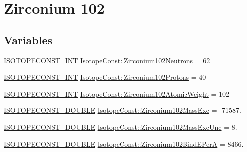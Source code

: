 \hypertarget{group___isotope_const-_zirconium-_zr102}{}\section{Zirconium 102}
\label{group___isotope_const-_zirconium-_zr102}
\subsection*{Variables}
\begin{DoxyCompactItemize}
\item 
\mbox{\hyperlink{group___isotope_const-_macros_ga5f18360b3e99483a35c32d789e62621c}{I\+S\+O\+T\+O\+P\+E\+C\+O\+N\+S\+T\+\_\+\+I\+NT}} \mbox{\hyperlink{group___isotope_const-_zirconium-_zr102_ga544e80a8b6996766583acc30407a1fa5}{Isotope\+Const\+::\+Zirconium102\+Neutrons}} = 62
\item 
\mbox{\hyperlink{group___isotope_const-_macros_ga5f18360b3e99483a35c32d789e62621c}{I\+S\+O\+T\+O\+P\+E\+C\+O\+N\+S\+T\+\_\+\+I\+NT}} \mbox{\hyperlink{group___isotope_const-_zirconium-_zr102_ga035b7fab1e47c9f0e38c1d3305ca6eb5}{Isotope\+Const\+::\+Zirconium102\+Protons}} = 40
\item 
\mbox{\hyperlink{group___isotope_const-_macros_ga5f18360b3e99483a35c32d789e62621c}{I\+S\+O\+T\+O\+P\+E\+C\+O\+N\+S\+T\+\_\+\+I\+NT}} \mbox{\hyperlink{group___isotope_const-_zirconium-_zr102_ga033aa639f92ea57a90415a6c7f9fc1ee}{Isotope\+Const\+::\+Zirconium102\+Atomic\+Weight}} = 102
\item 
\mbox{\hyperlink{group___isotope_const-_macros_ga8f45a7272ce02c0b4c65c44636ed719a}{I\+S\+O\+T\+O\+P\+E\+C\+O\+N\+S\+T\+\_\+\+D\+O\+U\+B\+LE}} \mbox{\hyperlink{group___isotope_const-_zirconium-_zr102_ga56216cb0dbc53b3847404fdcf24250de}{Isotope\+Const\+::\+Zirconium102\+Mass\+Exc}} = -\/71587.
\item 
\mbox{\hyperlink{group___isotope_const-_macros_ga8f45a7272ce02c0b4c65c44636ed719a}{I\+S\+O\+T\+O\+P\+E\+C\+O\+N\+S\+T\+\_\+\+D\+O\+U\+B\+LE}} \mbox{\hyperlink{group___isotope_const-_zirconium-_zr102_ga4437ad94a23d7fdfc1ee816f39ae94a2}{Isotope\+Const\+::\+Zirconium102\+Mass\+Exc\+Unc}} = 8.
\item 
\mbox{\hyperlink{group___isotope_const-_macros_ga8f45a7272ce02c0b4c65c44636ed719a}{I\+S\+O\+T\+O\+P\+E\+C\+O\+N\+S\+T\+\_\+\+D\+O\+U\+B\+LE}} \mbox{\hyperlink{group___isotope_const-_zirconium-_zr102_ga2018ca170c579f63c4c382485a5ae939}{Isotope\+Const\+::\+Zirconium102\+Bind\+E\+PerA}} = 8466.
\item 

\end{DoxyCompactItemize}

